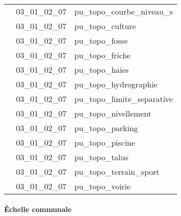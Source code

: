 \documentclass[12pt,titlepage]{book}
\begin{document}
\begin{supertabular}{|p{10cm}|c|p{15cm}|}
                    & 03\_01\_02\_07 & pu\_topo\_courbe\_niveau\_s\\


                    & 03\_01\_02\_07 & pu\_topo\_culture\\


                    & 03\_01\_02\_07 & pu\_topo\_fosse\\


                    & 03\_01\_02\_07 & pu\_topo\_friche\\


                    & 03\_01\_02\_07 & pu\_topo\_haies\\


                    & 03\_01\_02\_07 & pu\_topo\_hydrographie\\


                    & 03\_01\_02\_07 & pu\_topo\_limite\_separative\\


                    & 03\_01\_02\_07 & pu\_topo\_nivellement\\


                    & 03\_01\_02\_07 & pu\_topo\_parking\\


                    & 03\_01\_02\_07 & pu\_topo\_piscine\\


                    & 03\_01\_02\_07 & pu\_topo\_talus\\


                    & 03\_01\_02\_07 & pu\_topo\_terrain\_sport\\


                    & 03\_01\_02\_07 & pu\_topo\_voirie\\
\hline
\end{supertabular}


\paragraph{Échelle communale}
\noindent
\vspace{\baselineskip}
\end{document}
